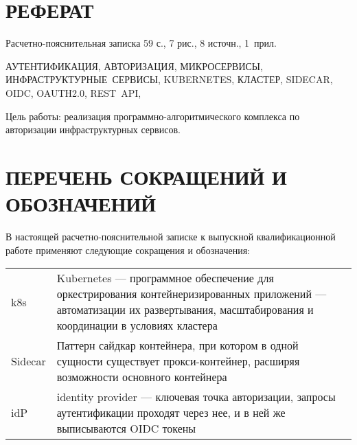 {\centering \chapter*{РЕФЕРАТ}}

Расчетно-пояснительная записка 59 с., 7 рис., 8 источн., \mbox{1 прил.}

\noindent \mbox{АУТЕНТИФИКАЦИЯ}, \mbox{АВТОРИЗАЦИЯ}, \mbox{МИКРОСЕРВИСЫ}, \mbox{ИНФРАСТРУКТУРНЫЕ СЕРВИСЫ}, \mbox{KUBERNETES}, \mbox{КЛАСТЕР},  \mbox{SIDECAR}, \mbox{OIDC}, \mbox{OAUTH2.0}, \mbox{REST API},

Цель работы: реализация программно-алгоритмического комплекса по авторизации инфраструктурных сервисов.

{\centering \maketableofcontents}

{\centering \chapter*{ПЕРЕЧЕНЬ СОКРАЩЕНИЙ И ОБОЗНАЧЕНИЙ}}

В настоящей расчетно-пояснительной записке к выпускной квалификационной работе применяют следующие сокращения и обозначения:

\begin{table}[H]
\begin{tabular}{p{5cm}p{10.5cm}}
k8s & Kubernetes --- программное обеспечение для оркестрирования контейнеризированных приложений --- автоматизации их развертывания, масштабирования и координации в условиях кластера
\tabularnewline
Sidecar & Паттерн сайдкар контейнера, при котором в одной сущности существует прокси-контейнер, расширяя возможности основного контейнера
\tabularnewline
idP & identity provider --- ключевая точка авторизации, запросы аутентификации проходят через нее, и в ней же выписываются OIDC токены
\tabularnewline
\end{tabular}
\end{table}